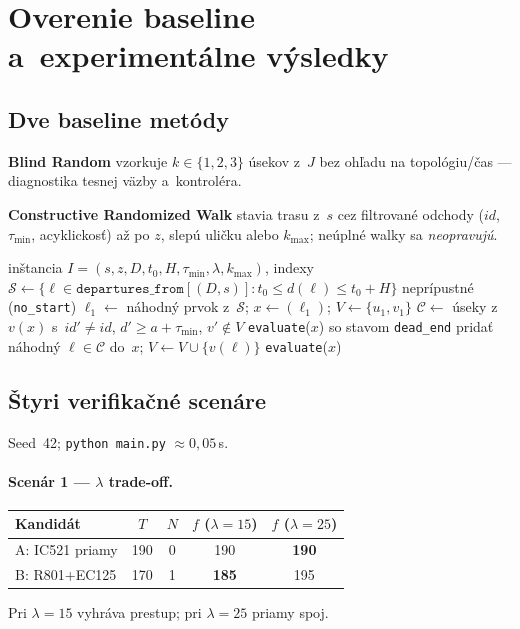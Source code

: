 \documentclass[11pt,a4paper]{article}
\begin{document}
\section{Overenie baseline a~experimentálne výsledky}

\subsection{Dve baseline metódy}

\textbf{Blind Random} vzorkuje $k\in\{1,2,3\}$ úsekov z~$J$ bez ohľadu na
topológiu/čas --- diagnostika tesnej väzby a~kontroléra.

\textbf{Constructive Randomized Walk} stavia trasu z~$s$ cez filtrované
odchody ($id$, $\tau_{\min}$, acyklickosť) až po $z$, slepú uličku alebo
$k_{\max}$; neúplné walky sa \emph{neopravujú}.

\begin{algorithm}[H]
\caption{Constructive Randomized Walk (jeden rollout)}
\begin{algorithmic}[1]
\Require inštancia $I=(s,z,D,t_0,H,\tau_{\min},\lambda,k_{\max})$, indexy
\State $\mathcal{S}\leftarrow\{\ell\in\texttt{departures\_from}[(D,s)]: t_0\le d(\ell)\le t_0+H\}$
 \Return neprípustné (\texttt{no\_start})
\EndIf
\State $\ell_1\leftarrow$ náhodný prvok z~$\mathcal{S}$; $x\leftarrow(\ell_1)$; $V\leftarrow\{u_1,v_1\}$
  \State $\mathcal{C}\leftarrow$ úseky z~$v(x)$ s~$id'\neq id$, $d'\ge a+\tau_{\min}$, $v'\notin V$
   \Return \texttt{evaluate}($x$) so stavom \texttt{dead\_end}
  \EndIf
  \State pridať náhodný $\ell\in\mathcal{C}$ do~$x$; $V\leftarrow V\cup\{v(\ell)\}$
\EndWhile
\State \Return \texttt{evaluate}($x$) 
\end{algorithmic}
\end{algorithm}

\subsection{Štyri verifikačné scenáre}

Seed~42; \texttt{python main.py} $\approx 0{,}05$\,s.

\paragraph{Scenár 1 --- $\lambda$ trade-off.}
\begin{center}
\small
\begin{tabular}{@{}lcccc@{}}
\toprule
Kandidát & $T$ & $N$ & $f$ ($\lambda{=}15$) & $f$ ($\lambda{=}25$) \\
\midrule
A: IC521 priamy & 190 & 0 & 190 & \textbf{190} \\
B: R801+EC125 & 170 & 1 & \textbf{185} & 195 \\
\bottomrule
\end{tabular}
\end{center}
Pri $\lambda=15$ vyhráva prestup; pri $\lambda=25$ priamy spoj.
\end{document}
